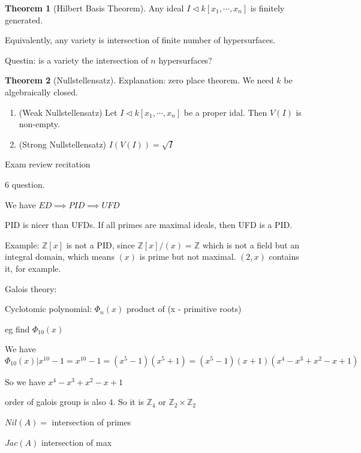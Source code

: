 \documentclass{article}
\theoremstyle{definition}
\newtheorem{theorem}{Theorem}
\begin{document}
\begin{theorem}
    [Hilbert Basis Theorem]

    Any ideal \(I \triangleleft k[x_1,\cdots,x_n]\) is finitely generated.

    Equivalently, any variety is intersection of finite number of hypersurfaces.
\end{theorem}

Questin: is a variety the intersection of \(n\) hypersurfaces?

\begin{theorem}
    [Nullstellensatz]

    Explanation: zero place theorem. We need \(k\) be algebraically closed.

    \begin{enumerate}
        \item (Weak Nullstellensatz) Let \(I \triangleleft k[x_1,\cdots,x_n]\) be a proper idal. Then \(V(I)\) is non-empty.
        \item (Strong Nullstellensatz) \(I(V(I)) = \sqrt{I} \)
    \end{enumerate}
\end{theorem}

\hrulefill

Exam review recitation

6 question.

We have \(ED \implies PID \implies UFD\) 

PID is nicer than UFDs. If all primes are maximal ideals, then UFD is a PID.

Example: \(\mathbb{Z}[x]\) is not a PID, since \(\mathbb{Z} [x]/(x)=\mathbb{Z}\) which is not a field but an integral domain, which means \((x)\) is prime but not maximal. \((2,x)\) contains it, for example.

Galois theory:

Cyclotomic polynomial: \(\Phi_n(x)\) product of (x - primitive roots)

eg find \(\Phi_{10}(x)\)

We have \(\Phi_{10}(x)|x^{10} - 1 = x^{10} - 1 = (x^5 - 1)(x^5 + 1) = (x^5 - 1)(x + 1)(x^4 - x^3 + x^2 - x + 1) \) 

So we have \(x^4 - x^3 + x^2 - x + 1\) 

order of galois group is also \(4\). So it is \(\mathbb{Z}_4\) or \(\mathbb{Z}_2\times \mathbb{Z}_2\) 

\(Nil(A) =\) intersection of primes

\(Jac(A)\) intersection of max
\end{document}
